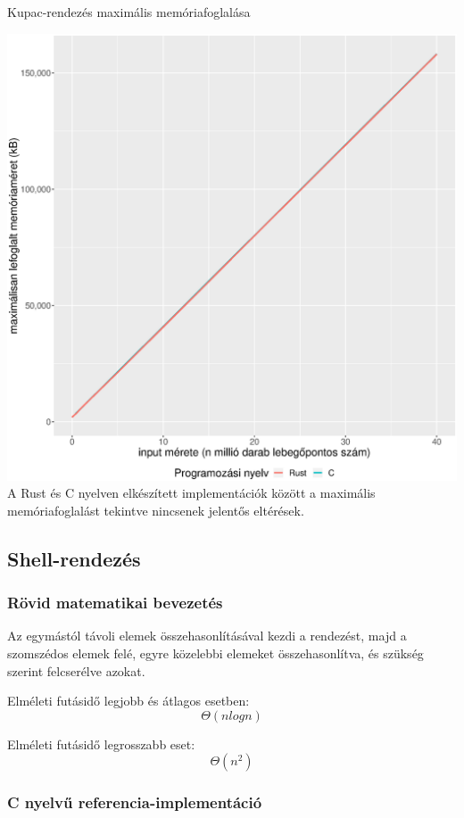 \noindent Kupac-rendezés maximális memóriafoglalása

\includegraphics[width=15.5cm]{kepek/heap_sort_memory.eps}
A Rust és C nyelven elkészített implementációk között a maximális memóriafoglalást tekintve nincsenek jelentős eltérések.

\subsection{Shell-rendezés}
\subsubsection{Rövid matematikai bevezetés}
Az egymástól távoli elemek összehasonlításával kezdi a rendezést, majd a szomszédos elemek felé, egyre közelebbi elemeket összehasonlítva, és szükség szerint felcserélve azokat. 

\noindent Elméleti futásidő legjobb és átlagos esetben:
\[\Theta(n log n) \]

\noindent Elméleti futásidő legrosszabb eset:
\[\Theta(n^2)\]

\subsubsection{C nyelvű referencia-implementáció}
